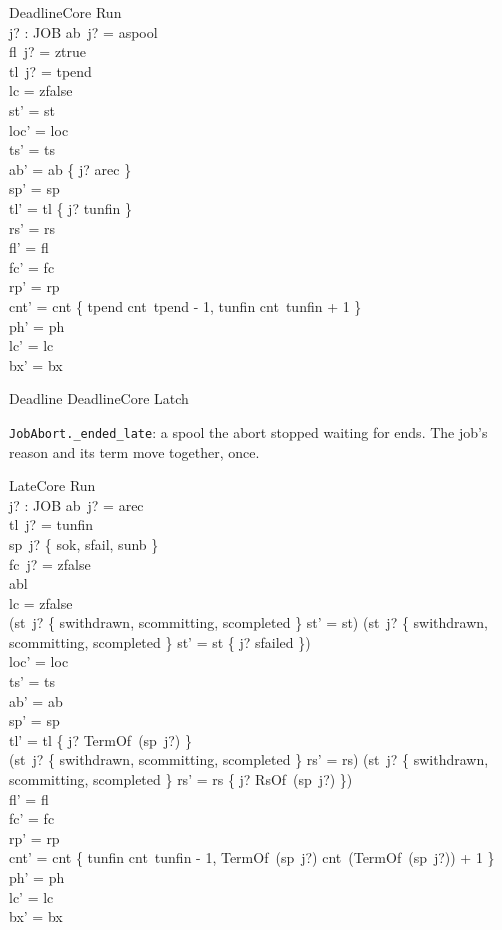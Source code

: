 \documentclass[a4paper,10pt,fleqn]{article}
\newcommand{\field}[1]{\texttt{#1}}
\begin{document}
\begin{schema}{DeadlineCore}
\Delta Run \\ j? : JOB
\where
ab~j? = aspool \\
fl~j? = ztrue \\
tl~j? = tpend \\
lc = zfalse \\
st' = st \\
loc' = loc \\
ts' = ts \\
ab' = ab \oplus \{ j? \mapsto arec \} \\
sp' = sp \\
tl' = tl \oplus \{ j? \mapsto tunfin \} \\
rs' = rs \\
fl' = fl \\
fc' = fc \\
rp' = rp \\
cnt' = cnt \oplus \{ tpend \mapsto cnt~tpend - 1, tunfin \mapsto cnt~tunfin + 1 \} \\
ph' = ph \\
lc' = lc \\
bx' = bx
\end{schema}

\begin{zed}
Deadline  DeadlineCore \land Latch
\end{zed}

\field{JobAbort.\_ended\_late}: a spool the abort stopped waiting for ends. The
job's reason and its term move together, once.

\begin{schema}{LateCore}
\Delta Run \\ j? : JOB
\where
ab~j? = arec \\
tl~j? = tunfin \\
sp~j? \in \{ sok, sfail, sunb \} \\
fc~j? = zfalse \\
abl  \\
lc = zfalse \\
(st~j? \in \{ swithdrawn, scommitting, scompleted \} \implies st' = st) \land (st~j? \notin \{ swithdrawn, scommitting, scompleted \} \implies st' = st \oplus \{ j? \mapsto sfailed \}) \\
loc' = loc \\
ts' = ts \\
ab' = ab \\
sp' = sp \\
tl' = tl \oplus \{ j? \mapsto TermOf~(sp~j?) \} \\
(st~j? \in \{ swithdrawn, scommitting, scompleted \} \implies rs' = rs) \land (st~j? \notin \{ swithdrawn, scommitting, scompleted \} \implies rs' = rs \oplus \{ j? \mapsto RsOf~(sp~j?) \}) \\
fl' = fl \\
fc' = fc \\
rp' = rp \\
cnt' = cnt \oplus \{ tunfin \mapsto cnt~tunfin - 1, TermOf~(sp~j?) \mapsto cnt~(TermOf~(sp~j?)) + 1 \} \\
ph' = ph \\
lc' = lc \\
bx' = bx
\end{schema}
\end{document}
